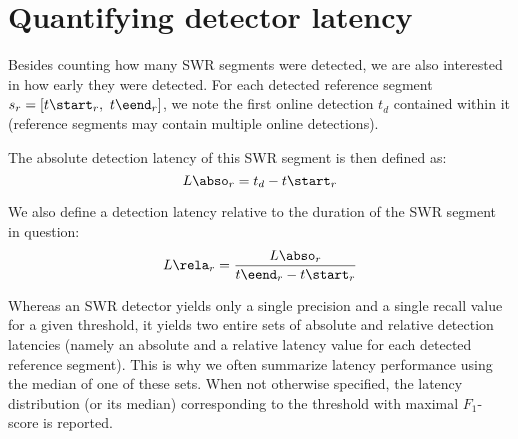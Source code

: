 \section{Quantifying detector latency}

Besides counting how many SWR segments were detected, we are also interested in how early they were detected. For each detected reference segment $s_r = [ t\start_r,\ t\eend_r ]$, we note the first online detection $t_d$ contained within it (reference segments may contain multiple online detections).

The absolute detection latency of this SWR segment is then defined as:
\begin{equation}
L\abso_r = t_d - t\start_r 
\end{equation}

We also define a detection latency relative to the duration of the SWR segment in question:
\begin{equation}
L\rela_r = \frac{L\abso_r}{t\eend_r - t\start_r} 
\end{equation}

Whereas an SWR detector yields only a single precision and a single recall value for a given threshold, it yields two entire sets of absolute and relative detection latencies (namely an absolute and a relative latency value for each detected reference segment). This is why we often summarize latency performance using the median of one of these sets. When not otherwise specified, the latency distribution (or its median) corresponding to the threshold with maximal $F_1$-score is reported.
